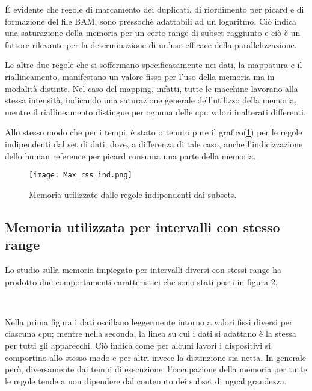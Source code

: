 \'E evidente che regole di marcamento dei duplicati, di riordimento per picard e di formazione del file BAM, sono pressochè adattabili ad un logaritmo. 
Ciò indica una saturazione della memoria per un certo range di subset raggiunto e ciò è un fattore rilevante per la determinazione di un'uso efficace della parallelizzazione.

Le altre due regole che si soffermano specificatamente nei dati, la mappatura e il riallineamento, manifestano un valore fisso per l'uso della memoria ma in modalità distinte.
Nel caso del mapping, infatti, tutte le macchine lavorano alla stessa intensità, indicando una saturazione generale dell'utilizzo della memoria, mentre il riallineamento distingue per ognuna delle cpu valori inalterati differenti. 

Allo stesso modo che per i tempi, è stato ottenuto pure il grafico(\ref{fig:RSSind}) per le regole indipendenti dal set di dati, dove, a differenza di tale caso, anche l'indicizzazione dello human reference per picard consuma una parte della memoria.

\begin{figure}[H]
\centering
\texttt{[image: Max\_rss\_ind.png]}
\caption{Memoria utilizzate dalle regole indipendenti dai subsets.}
\label{fig:RSSind}
\end{figure}

\subsection{Memoria utilizzata per intervalli con stesso range}
Lo studio sulla memoria impiegata per intervalli diversi con stessi range ha prodotto due comportamenti caratteristici che sono stati posti in figura \ref{fig:RSSrng}.
\begin{figure}[H]
\centering
{} \quad
{} \\
\caption{}
\label{fig:RSSrng}
\end{figure}

Nella prima figura i dati oscillano leggermente intorno a valori fissi diversi per ciascuna cpu; mentre nella seconda, la linea su cui i dati si adattano è la stessa per tutti gli apparecchi.
Ciò indica come per alcuni lavori i dispositivi si comportino allo stesso modo e per altri invece la distinzione sia netta. 
In generale però, diversamente dai tempi di esecuzione, l'occupazione della memoria per tutte le regole tende a non dipendere dal contenuto dei subset di ugual grandezza.


